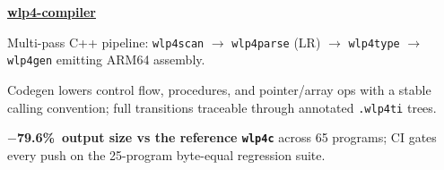 \begin{twocolentry}{}
\href{https://github.com/faketut/C-class-compiler}{\textbf{wlp4-compiler}}
\end{twocolentry}
\begin{onecolentry}
\begin{highlights}
\item Multi-pass C++ pipeline: \texttt{wlp4scan} $\rightarrow$ \texttt{wlp4parse} (LR) $\rightarrow$ \texttt{wlp4type} $\rightarrow$ \texttt{wlp4gen} emitting ARM64 assembly.
\item Codegen lowers control flow, procedures, and pointer/array ops with a stable calling convention; full transitions traceable through annotated \texttt{.wlp4ti} trees.
\item \textbf{$-$79.6\%\ output size vs the reference \texttt{wlp4c}} across 65 programs; CI gates every push on the 25-program byte-equal regression suite.
\end{highlights}
\end{onecolentry}
